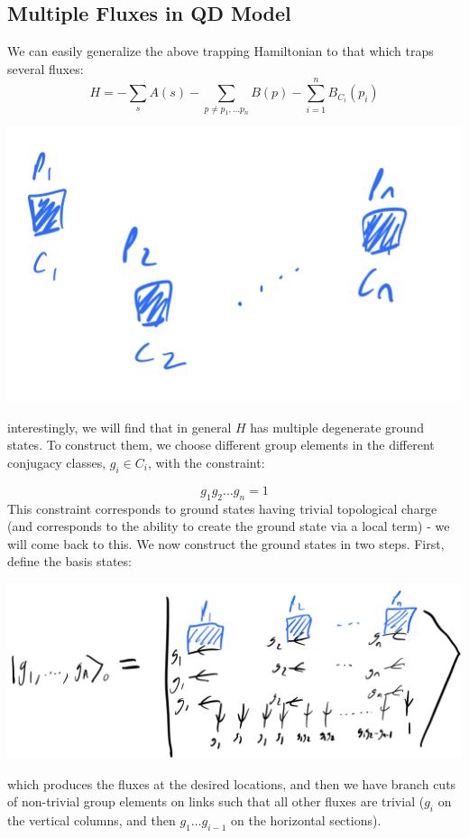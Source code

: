 \subsection{Multiple Fluxes in QD Model}
We can easily generalize the above trapping Hamiltonian to that which traps several fluxes:
\begin{equation}
    H = -\sum_s A(s) - \sum_{p \neq p_1, \ldots p_n}B(p) - \sum_{i=1}^n B_{C_i}(p_i)
\end{equation}
\begin{center}
    \includegraphics[scale=0.35]{Lectures/Images/lec9-multiplefluxes.png}
\end{center}

interestingly, we will find that in general $H$ has multiple degenerate ground states. To construct them, we choose different group elements in the different conjugacy classes, $g_i \in C_i$, with the constraint:

\begin{equation}
    g_1g_2 \ldots g_n = 1
\end{equation}
This constraint corresponds to ground states having trivial topological charge (and corresponds to the ability to create the ground state via a local term) - we will come back to this. We now construct the ground states in two steps. First, define the basis states:
\begin{center}
    \includegraphics[scale=0.35]{Lectures/Images/lec9-naughtstates.png}
\end{center}
which produces the fluxes at the desired locations, and then we have branch cuts of non-trivial group elements on links such that all other fluxes are trivial ($g_i$ on the vertical columns, and then $g_1 \ldots g_{i-1}$ on the horizontal sections).

